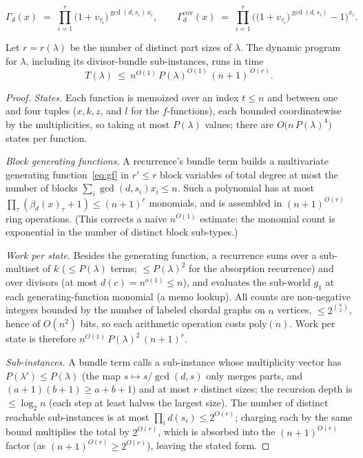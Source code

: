 \documentclass[10pt,a4paper]{amsart}
\begin{document}
\begin{equation}\label{eq:gf}
\Gamma_d(x)\;=\;\prod_{i=1}^{r}\big(1+v_{\tau_i}\big)^{\gcd(d,s_i)\,x_i},
\qquad
\Gamma_d^{\mathrm{cov}}(x)\;=\;\prod_{i=1}^{r}\Big(\big(1+v_{\tau_i}\big)^{\gcd(d,s_i)}-1\Big)^{x_i}.
\end{equation}

\begin{lemma}\label{lem:percost}
Let $r=r(\lambda)$ be the number of distinct part sizes of $\lambda$. The dynamic program for
$\lambda$, including its divisor-bundle sub-instances, runs in time
\[
T(\lambda)\ \le\ n^{O(1)}\,P(\lambda)^{O(1)}\,(n+1)^{\,O(r)}.
\]
\end{lemma}

\begin{proof}
\emph{States.} Each function is memoized over an index $t\le n$ and between one and four tuples
($x,k,z$, and $l$ for the $f$-functions), each bounded coordinatewise by the multiplicities, so
taking at most $P(\lambda)$ values; there are $O\!\big(n\,P(\lambda)^4\big)$ states per function.

\emph{Block generating functions.} A recurrence's bundle term builds a multivariate generating
function~\eqref{eq:gf} in $r'\le r$ block variables of total degree at most the number of blocks
$\sum_i\gcd(d,s_i)x_i\le n$. Such a polynomial has at most $\prod_\tau(\beta_d(x)_\tau+1)\le(n+1)^{r}$
monomials, and is assembled in $(n+1)^{O(r)}$ ring operations. (This corrects a naive
$n^{O(1)}$ estimate: the monomial count is exponential in the number of distinct block sub-types.)

\emph{Work per state.} Besides the generating function, a recurrence sums over a sub-multiset of $k$
($\le P(\lambda)$ terms; $\le P(\lambda)^2$ for the absorption recurrence) and over divisors
(at most $d(c)=n^{o(1)}\le n$), and evaluates the sub-world $g_1$ at each generating-function monomial (a memo
lookup). All counts are non-negative integers bounded by the number of labeled chordal graphs on $n$
vertices, $\le 2^{\binom n2}$, hence of $O(n^2)$ bits, so each arithmetic operation costs
$\mathrm{poly}(n)$. Work per state is therefore $n^{O(1)}\,P(\lambda)^{2}\,(n+1)^{r}$.

\emph{Sub-instances.} A bundle term calls a sub-instance whose multiplicity vector has
$P(\lambda')\le P(\lambda)$ (the map $s\mapsto s/\gcd(d,s)$ only merges parts, and
$(a{+}1)(b{+}1)\ge a{+}b{+}1$) and at most $r$ distinct sizes; the recursion depth is $\le\log_2 n$
(each step at least halves the largest size). The number of distinct reachable sub-instances is at
most $\prod_i d(s_i)\le 2^{O(r)}$; charging each by the same bound multiplies the total by $2^{O(r)}$,
which is absorbed into the $(n+1)^{O(r)}$ factor (as $(n+1)^{O(r)}\ge 2^{O(r)}$), leaving the stated
form.
\end{proof}
\end{document}
